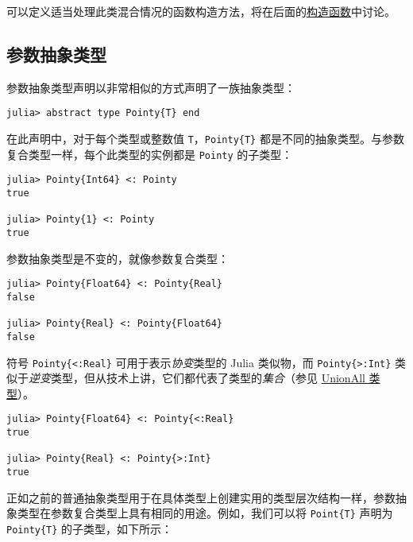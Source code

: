 可以定义适当处理此类混合情况的函数构造方法，将在后面的\hyperlink{1489967485005487723}{构造函数}中讨论。



\hypertarget{2167251626535554270}{}


\subsection{参数抽象类型}



参数抽象类型声明以非常相似的方式声明了一族抽象类型：




\begin{verbatim}
julia> abstract type Pointy{T} end
\end{verbatim}



在此声明中，对于每个类型或整数值 \texttt{T}，\texttt{Pointy\{T\}} 都是不同的抽象类型。与参数复合类型一样，每个此类型的实例都是 \texttt{Pointy} 的子类型：




\begin{verbatim}
julia> Pointy{Int64} <: Pointy
true

julia> Pointy{1} <: Pointy
true
\end{verbatim}



参数抽象类型是不变的，就像参数复合类型：




\begin{verbatim}
julia> Pointy{Float64} <: Pointy{Real}
false

julia> Pointy{Real} <: Pointy{Float64}
false
\end{verbatim}



符号 \texttt{Pointy\{<:Real\}} 可用于表示\emph{协变}类型的 Julia 类似物，而 \texttt{Pointy\{>:Int\}} 类似于\emph{逆变}类型，但从技术上讲，它们都代表了类型的\emph{集合}（参见 \hyperlink{11072845175692859046}{UnionAll 类型}）。




\begin{verbatim}
julia> Pointy{Float64} <: Pointy{<:Real}
true

julia> Pointy{Real} <: Pointy{>:Int}
true
\end{verbatim}



正如之前的普通抽象类型用于在具体类型上创建实用的类型层次结构一样，参数抽象类型在参数复合类型上具有相同的用途。例如，我们可以将 \texttt{Point\{T\}} 声明为 \texttt{Pointy\{T\}} 的子类型，如下所示：





